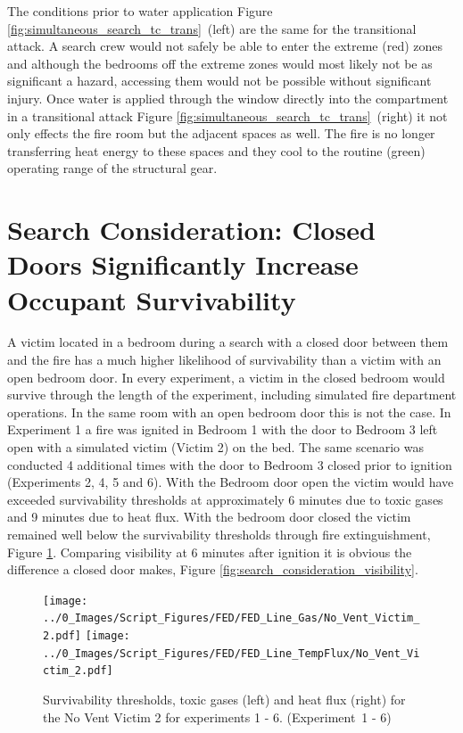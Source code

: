 \documentclass[12pt,oneside]{book}
\begin{document}
The conditions prior to water application Figure \ref{fig:simultaneous_search_tc_trans}~(left) are the same for the transitional attack. A search crew would not safely be able to enter the extreme (red) zones and although the bedrooms off the extreme zones would most likely not be as significant a hazard, accessing them would not be possible without significant injury. Once water is applied through the window directly into the compartment in a transitional attack Figure \ref{fig:simultaneous_search_tc_trans}~(right) it not only effects the fire room but the adjacent spaces as well. The fire is no longer transferring heat energy to these spaces and they cool to the routine (green) operating range of the structural gear. 

\section{Search Consideration: Closed Doors Significantly Increase Occupant Survivability} \label{tc:Search_Considersation_Closed_Doors}
A victim located in a bedroom during a search with a closed door between them and the fire has a much higher likelihood of survivability than a victim with an open bedroom door.  In every experiment, a victim in the closed bedroom would survive through the length of the experiment, including simulated fire department operations.  In the same room with an open bedroom door this is not the case.  In Experiment 1 a fire was ignited in Bedroom 1 with the door to Bedroom 3 left open with a simulated victim (Victim 2) on the bed.  The same scenario was conducted 4 additional times with the door to Bedroom 3 closed prior to ignition (Experiments 2, 4, 5 and 6).   With the Bedroom door open the victim would have exceeded survivability thresholds at approximately 6 minutes due to toxic gases and 9 minutes due to heat flux.  With the bedroom door closed the victim remained well below the survivability thresholds through fire extinguishment, Figure \ref{fig:search_consideration_survivability}. Comparing visibility at 6 minutes after ignition it is obvious the difference a closed door makes, Figure \ref{fig:search_consideration_visibility}. 

\begin{figure}[H]
\centering
\texttt{[image: ../0\_Images/Script\_Figures/FED/FED\_Line\_Gas/No\_Vent\_Victim\_2.pdf]}
\texttt{[image: ../0\_Images/Script\_Figures/FED/FED\_Line\_TempFlux/No\_Vent\_Victim\_2.pdf]}
\caption[Survivability Thresholds - Toxic Gases - Heat Flux]{Survivability thresholds, toxic gases (left) and heat flux (right) for the No Vent Victim 2 for experiments 1 - 6. (Experiment~1 - 6)}
\label{fig:search_consideration_survivability}
\end{figure}
\end{document}
